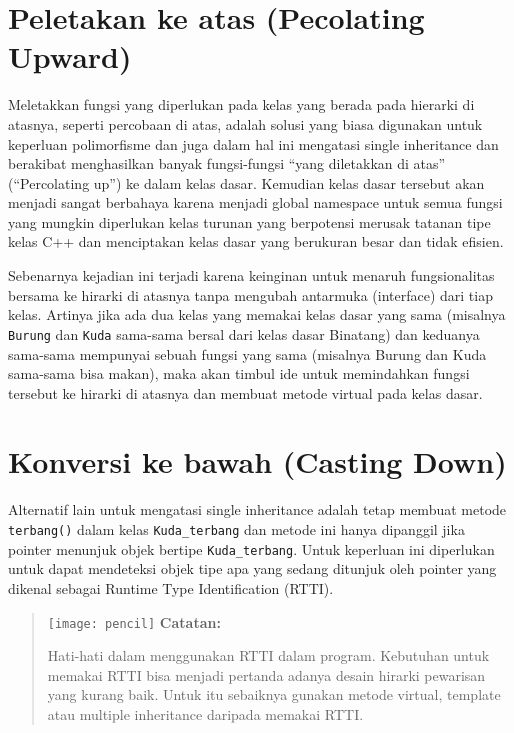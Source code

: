 \section{Peletakan ke atas (Pecolating
Upward)}\label{peletakan-ke-atas-pecolating-upward}

Meletakkan fungsi yang diperlukan pada kelas yang berada pada hierarki
di atasnya, seperti percobaan di atas, adalah solusi yang biasa
digunakan untuk keperluan polimorfisme dan juga dalam hal ini mengatasi
single inheritance dan berakibat menghasilkan banyak fungsi-fungsi
``yang diletakkan di atas'' (``Percolating up'') ke dalam kelas dasar.
Kemudian kelas dasar tersebut akan menjadi sangat berbahaya karena
menjadi global namespace untuk semua fungsi yang mungkin diperlukan
kelas turunan yang berpotensi merusak tatanan tipe kelas C++ dan
menciptakan kelas dasar yang berukuran besar dan tidak efisien.

Sebenarnya kejadian ini terjadi karena keinginan untuk menaruh
fungsionalitas bersama ke hirarki di atasnya tanpa mengubah antarmuka
(interface) dari tiap kelas. Artinya jika ada dua kelas yang memakai
kelas dasar yang sama (misalnya \texttt{Burung} dan \texttt{Kuda}
sama-sama bersal dari kelas dasar Binatang) dan keduanya sama-sama
mempunyai sebuah fungsi yang sama (misalnya Burung dan Kuda sama-sama
bisa makan), maka akan timbul ide untuk memindahkan fungsi tersebut ke
hirarki di atasnya dan membuat metode virtual pada kelas dasar.

\section{Konversi ke bawah (Casting
Down)}\label{konversi-ke-bawah-casting-down}

Alternatif lain untuk mengatasi single inheritance adalah tetap membuat
metode \texttt{terbang()} dalam kelas \texttt{Kuda\_terbang} dan metode
ini hanya dipanggil jika pointer menunjuk objek bertipe
\texttt{Kuda\_terbang}. Untuk keperluan ini diperlukan untuk dapat
mendeteksi objek tipe apa yang sedang ditunjuk oleh pointer yang dikenal
sebagai Runtime Type Identification (RTTI).
\begin{quotation}
	\texttt{[image: pencil]} \textbf{Catatan:}
	 
	 Hati-hati dalam menggunakan RTTI dalam program. Kebutuhan untuk memakai
	 RTTI bisa menjadi pertanda adanya desain hirarki pewarisan yang kurang
	 baik. Untuk itu sebaiknya gunakan metode virtual, template atau multiple
	 inheritance daripada memakai RTTI.
\end{quotation}


